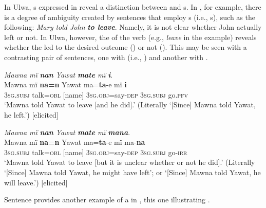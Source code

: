   In Ulwa, s expressed in  reveal a distinction between  and  s. In , for example, there is a degree of ambiguity created by sentences that employ s (i.e., s), such as the following: \textit{Mary told John} \textbf{\textit{to leave}}. Namely, it is not clear whether John actually left or not. In Ulwa, however, the  of the verb (e.g., \textit{leave} in the \linebreak {} example) reveals whether the  led to the desired outcome () or not (). This may be seen with a contrasting pair of sentences, one with   (i.e.,  )  and another with   .

\ea%
    \label{ex:syntax:356}
          \textit{Mawna mï} \textbf{\textit{nan}} \textit{Yawat} \textbf{\textit{mate}} \textit{mï} \textbf{\textit{i}}.\\
\gll Mawna  mï      \textbf{na=n}    Yawat  ma=\textbf{ta}{}-e      mï \textbf{i}\\
    [name]    3\textsc{sg.subj}  talk=\textsc{obl}  [name]  3\textsc{sg.obj}=say-\textsc{dep}  3\textsc{sg.subj}    go.\textsc{pfv}\\
\glt `Mawna told Yawat to leave [and he did].’ (Literally ‘[Since] Mawna told Yawat, he left.’) [elicited]
\z

\ea%
    \label{ex:syntax:357}
          \textit{Mawna mï} \textbf{\textit{nan}} \textit{Yawat} \textbf{\textit{mate}} \textit{mï} \textbf{\textit{mana}}.\\
\gll Mawna  mï      \textbf{na=n}    Yawat  ma=\textbf{ta}{}-e      mï ma-\textbf{na}\\
    [name]    3\textsc{sg.subj}  talk=\textsc{obl}  [name] 3\textsc{sg.obj}=say-\textsc{dep}  \textsc{3sg.subj}    go-\textsc{irr}\\
\glt `Mawna told Yawat to leave [but it is unclear whether or not he did].’ (Literally ‘[Since] Mawna told Yawat, he might have left’; or ‘[Since] Mawna told Yawat, he will leave.’) [elicited]
\z

Sentence  provides another example of a  in , this one illustrating  .


